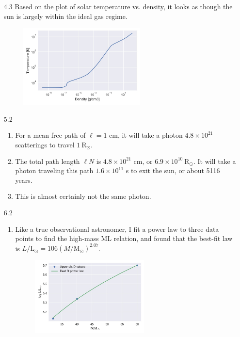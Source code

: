 \documentclass[11pt]{article}
\newcommand\lsol{\mathrm{L}_\odot}
\newcommand\rsol{\mathrm{R}_\odot}
\newcommand\msol{\mathrm{M}_\odot}
\begin{document}
\begin{enumerate}
\item [4.3]
    Based on the plot of solar temperature vs. density, it looks as though the sun is largely within the ideal gas regime.
	\begin{figure}[H]
	\centering
	\includegraphics[width=0.6\textwidth]{temp_density.jpg}
	\end{figure}

\item [5.2]
	\begin{enumerate}
	
    \item For a mean free path of $\ell = 1$ cm, it will take a photon $4.8 \times 10^{21}$ scatterings to travel $1~\rsol$.
    
    \item The total path length $\ell N$ is $4.8 \times 10^{21}$ cm, or $6.9 \times 10^{10}~\rsol$. It will take a photon traveling this path $1.6 \times 10^{11}$ s to exit the sun, or about 5116 years.
    
    \item This is almost certainly not the same photon.
    
    \end{enumerate}

\item [6.2]
	\begin{enumerate}
    
    \item Like a true observational astronomer, I fit a power law to three data points to find the high-mass ML relation, and found that the best-fit law is $L/\lsol = 106(M/\msol)^{2.07}$.
	\begin{figure}[H]
	\centering
	\includegraphics[width=0.6\textwidth]{powerlaw.jpg}
	\end{figure}
    

\end{enumerate}
\end{enumerate}
\end{document}
